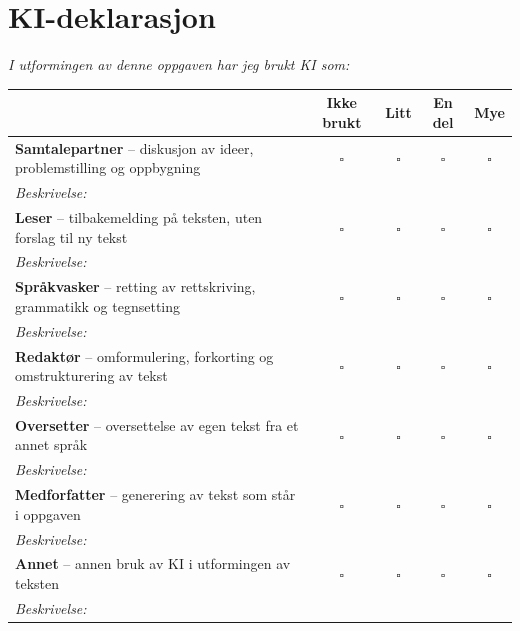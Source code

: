 
\section*{KI-deklarasjon}


\medskip

\noindent\textit{I utformingen av denne oppgaven har jeg brukt KI som:}

\medskip
\noindent
\begin{tabularx}{\linewidth}{|X|c|c|c|c|}
\hline
 & \textbf{Ikke brukt} & \textbf{Litt} & \textbf{En del} & \textbf{Mye} \\ \hline
\textbf{Samtalepartner} -- {\small diskusjon av ideer, problemstilling og oppbygning} & $\square$ & $\square$ & $\square$ & $\square$ \\
\multicolumn{5}{|p{\dimexpr\linewidth-2\tabcolsep\relax}|}{\small\textit{Beskrivelse:} } \\ \hline
\textbf{Leser} -- {\small tilbakemelding på teksten, uten forslag til ny tekst} & $\square$ & $\square$ & $\square$ & $\square$ \\
\multicolumn{5}{|p{\dimexpr\linewidth-2\tabcolsep\relax}|}{\small\textit{Beskrivelse:} } \\ \hline
\textbf{Språkvasker} -- {\small retting av rettskriving, grammatikk og tegnsetting} & $\square$ & $\square$ & $\square$ & $\square$ \\
\multicolumn{5}{|p{\dimexpr\linewidth-2\tabcolsep\relax}|}{\small\textit{Beskrivelse:} } \\ \hline
\textbf{Redaktør} -- {\small omformulering, forkorting og omstrukturering av tekst} & $\square$ & $\square$ & $\square$ & $\square$ \\
\multicolumn{5}{|p{\dimexpr\linewidth-2\tabcolsep\relax}|}{\small\textit{Beskrivelse:} } \\ \hline
\textbf{Oversetter} -- {\small oversettelse av egen tekst fra et annet språk} & $\square$ & $\square$ & $\square$ & $\square$ \\
\multicolumn{5}{|p{\dimexpr\linewidth-2\tabcolsep\relax}|}{\small\textit{Beskrivelse:} } \\ \hline
\textbf{Medforfatter} -- {\small generering av tekst som står i oppgaven} & $\square$ & $\square$ & $\square$ & $\square$ \\
\multicolumn{5}{|p{\dimexpr\linewidth-2\tabcolsep\relax}|}{\small\textit{Beskrivelse:} } \\ \hline
\textbf{Annet} -- {\small annen bruk av KI i utformingen av teksten} & $\square$ & $\square$ & $\square$ & $\square$ \\
\multicolumn{5}{|p{\dimexpr\linewidth-2\tabcolsep\relax}|}{\small\textit{Beskrivelse:} } \\ \hline
\end{tabularx}

